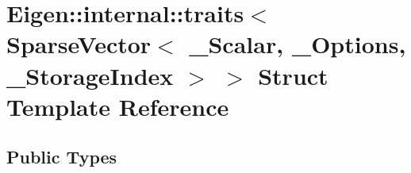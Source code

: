 \hypertarget{struct_eigen_1_1internal_1_1traits_3_01_sparse_vector_3_01___scalar_00_01___options_00_01___storage_index_01_4_01_4}{}\section{Eigen\+:\+:internal\+:\+:traits$<$ Sparse\+Vector$<$ \+\_\+\+Scalar, \+\_\+\+Options, \+\_\+\+Storage\+Index $>$ $>$ Struct Template Reference}
\label{struct_eigen_1_1internal_1_1traits_3_01_sparse_vector_3_01___scalar_00_01___options_00_01___storage_index_01_4_01_4}
\subsection*{Public Types}
